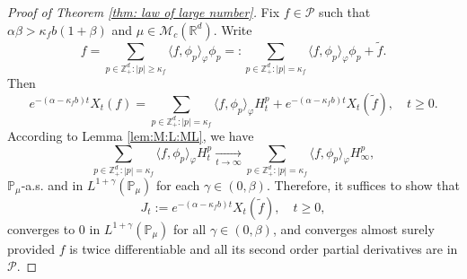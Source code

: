 \documentclass[EJP]{ejpecp} %
\begin{document}
\begin{proof}[Proof of Theorem \ref{thm: law of large number}]
	Fix $f \in \mathcal P$ such that $\alpha \beta > \kappa_f b (1+\beta)$ and $\mu \in \mathcal M_c(\mathbb R^d)$.
	Write
\[
    f
    = \sum_{p\in \mathbb Z_+^d:|p|\geq \kappa_f}\langle f,\phi_p\rangle_\varphi \phi_p
    =: \sum_{p\in \mathbb Z_+^d:|p|= \kappa_f}\langle f,\phi_p\rangle_\varphi \phi_p+\widetilde{f}.
\]
	Then
\[
    e^{-(\alpha-\kappa_fb)t}X_t(f)=
      \sum_{p\in \mathbb Z_+^d:|p|= \kappa_f}\langle f,\phi_p\rangle_\varphi H_t^p+e^{-(\alpha-\kappa_fb)t} X_t(\widetilde{f}),
      \quad t\geq 0.
\]
	According to Lemma \ref{lem:M:L:ML}, we have
\begin{equation}
\label{as convergence}
    \sum_{p\in \mathbb{Z}_+^d:|p|= \kappa_f}\langle f,\phi_p\rangle_\varphi H_t^p
    \xrightarrow[t\to \infty]{} \sum_{p\in \mathbb{Z}_+^d:|p|=\kappa_f}\langle f, \phi_p\rangle_{\varphi} H_{\infty}^p,
\end{equation}
	$\mathbb{P}_{\mu}$-a.s. and in $L^{1+\gamma}(\mathbb{P}_{\mu})$ for each $\gamma\in(0,\beta)$.
	Therefore, it suffices to show that
\[
    J_t
    :=e^{-(\alpha-\kappa_fb)t}X_t( \widetilde{f}),
    \quad t\geq 0,
\]
	converges to $0$ in $L^{1+\gamma}(\mathbb{P}_{\mu})$ for all $\gamma\in(0,\beta)$, and converges almost surely provided $f$ is twice differentiable and all its second order partial derivatives are in $\mathcal{P}$.


\end{proof}
\end{document}
